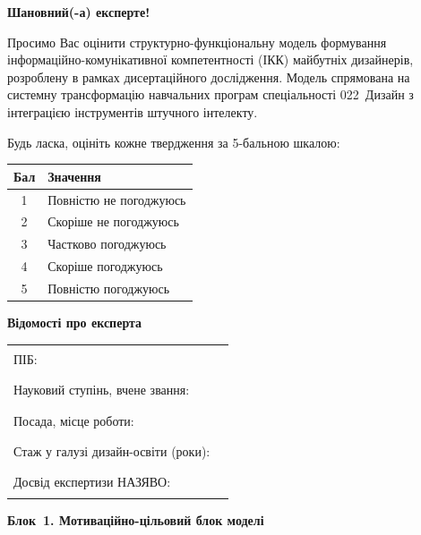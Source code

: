 \textbf{Шановний(-а) експерте!}

Просимо Вас оцінити структурно-функціональну модель формування інформаційно-комунікативної компетентності (ІКК) майбутніх дизайнерів, розроблену в рамках дисертаційного дослідження. Модель спрямована на системну трансформацію навчальних програм спеціальності 022~Дизайн з інтеграцією інструментів штучного інтелекту.

Будь ласка, оцініть кожне твердження за 5-бальною шкалою:

\begin{center}
\small
\begin{tabular}{cl}
\toprule
\textbf{Бал} & \textbf{Значення} \\
\midrule
1 & Повністю не погоджуюсь \\
2 & Скоріше не погоджуюсь \\
3 & Частково погоджуюсь \\
4 & Скоріше погоджуюсь \\
5 & Повністю погоджуюсь \\
\bottomrule
\end{tabular}
\end{center}

\vspace{0.3cm}

\textbf{Відомості про експерта}\\[0.2cm]
\begin{tabular}{@{}p{}p{}@{}}
ПІБ: & \rule{0.50\textwidth}{0.4pt} \\[0.3cm]
Науковий ступінь, вчене звання: & \rule{0.50\textwidth}{0.4pt} \\[0.3cm]
Посада, місце роботи: & \rule{0.50\textwidth}{0.4pt} \\[0.3cm]
Стаж у галузі дизайн-освіти (роки): & \rule{0.50\textwidth}{0.4pt} \\[0.3cm]
Досвід експертизи НАЗЯВО: & \rule{0.50\textwidth}{0.4pt} \\[0.3cm]
\end{tabular}

\vspace{0.5cm}

\textbf{Блок~1. Мотиваційно-цільовий блок моделі}

